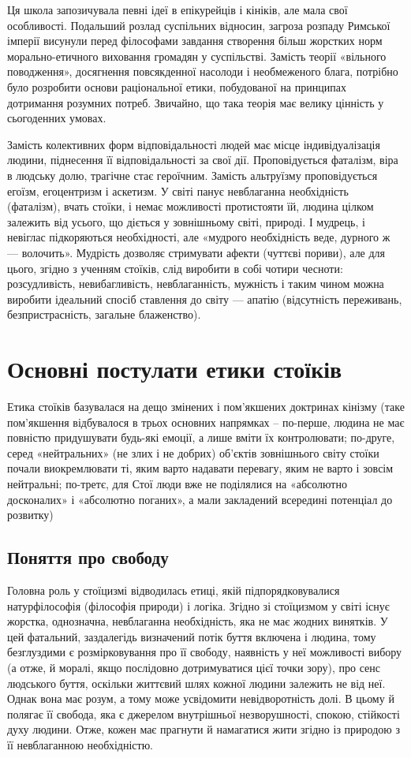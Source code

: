 \documentclass[14pt]{extarticle} %
\begin{document}
Ця школа запозичувала певні ідеї в епікурейців і кініків, але мала свої особливості. Подальший розлад суспільних відносин, загроза розпаду Римської 
імперії висунули перед філософами завдання створення більш жорстких норм морально-етичного виховання громадян у суспільстві. Замість теорії 
«вільного поводження», досягнення повсякденної насолоди і необмеженого блага, потрібно було розробити основи раціональної етики, побудованої
на принципах дотримання розумних потреб. Звичайно, що така теорія має велику цінність у сьогоденних умовах.

Замість колективних форм відповідальності людей має місце індивідуалізація людини, піднесення її відповідальності за свої дії. Проповідується
фаталізм, віра в людську долю, трагічне стає героїчним. Замість альтруїзму проповідується  егоїзм, егоцентризм і аскетизм. У світі
панує невблаганна необхідність (фаталізм), вчать стоїки, і немає можливості протистояти їй, людина цілком залежить від усього, що діється
у зовнішньому світі, природі. І мудрець, і невіглас підкоряються необхідності, але «мудрого необхідність веде, дурного ж — волочить».
Мудрість дозволяє стримувати афекти (чуттєві пориви), але для цього, згідно з ученням стоїків, слід виробити в собі чотири чесноти: 
розсудливість, невибагливість, невблаганність, мужність і таким чином можна вироби­ти ідеальний спосіб ставлення до світу — апатію (відсутність
переживань, безпристрасність, загальне блаженство).
\section{Основні постулати етики стоїків}
Етика стоїків базувалася на дещо змінених і пом’якшених доктринах кінізму (таке пом’якшення відбувалося в трьох основних напрямках – по-перше, людина не має повністю придушувати будь-які емоції, а лише вміти їх контролювати; по-друге, серед «нейтральних» (не злих і не добрих) об’єктів зовнішнього світу стоїки почали виокремлювати ті, яким варто надавати перевагу, яким не варто і зовсім нейтральні; по-третє, для Стої люди вже не поділялися на «абсолютно досконалих» і «абсолютно поганих», а мали закладений всередині потенціал до розвитку)
\subsection{Поняття про свободу}%
Головна роль у стоїцизмі відводилась етиці, якій підпорядковувалися натурфілософія (філософія природи) і логіка. Згідно зі стоїцизмом у світі існує жорстка, однозначна, невблаганна необхідність, яка не має жодних винятків. У цей фатальний, заздалегідь визначений потік буття включена і людина, тому безглуздими є розмірковування про її свободу, наявність у неї можливості вибору (а отже, й моралі, якщо послідовно дотримуватися цієї точки зору), про сенс людського буття, оскільки життєвий шлях кожної людини залежить не від неї. Однак вона має розум, а тому може усвідомити невідворотність долі. В цьому й полягає її свобода, яка є джерелом внутрішньої незворушності, спокою, стійкості духу людини. Отже, кожен має прагнути й намагатися жити згідно із природою з її невблаганною необхідністю.
\end{document}
